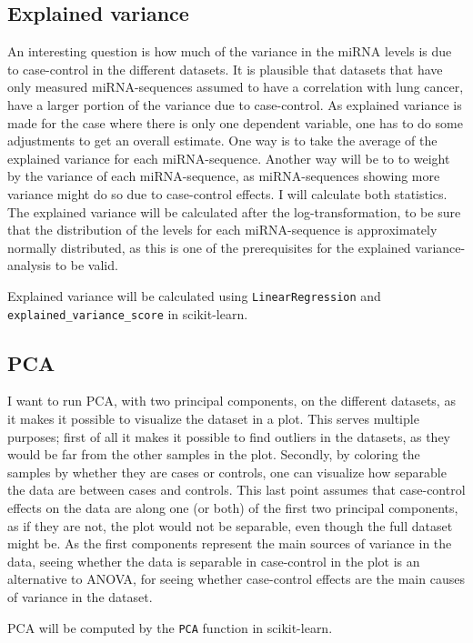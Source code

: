 \subsection{Explained variance}
An interesting question is how much of the variance in the miRNA levels is due to case-control in the different datasets. It is plausible that datasets that have only measured miRNA-sequences assumed to have a correlation with lung cancer, have a larger portion of the variance due to case-control. As explained variance is made for the case where there is only one dependent variable, one has to do some adjustments to get an overall estimate. One way is to take the average of the explained variance for each miRNA-sequence. Another way will be to to weight by the variance of each miRNA-sequence, as miRNA-sequences showing more variance might do so due to case-control effects. I will calculate both statistics. The explained variance will be calculated after the log-transformation, to be sure that the distribution of the levels for each miRNA-sequence is approximately normally distributed, as this is one of the prerequisites for the explained variance-analysis to be valid.

Explained variance will be calculated using \verb|LinearRegression| and \\ \verb|explained_variance_score| in scikit-learn.

\subsection{PCA}
I want to run PCA, with two principal components, on the different datasets, as it makes it possible to visualize the dataset in a plot. This serves multiple purposes; first of all it makes it possible to find outliers in the datasets, as they would be far from the other samples in the plot. Secondly, by coloring the samples by whether they are cases or controls, one can visualize how separable the data are between cases and controls. This last point assumes that case-control effects on the data are along one (or both) of the first two principal components, as if they are not, the plot would not be separable, even though the full dataset might be. As the first components represent the main sources of variance in the data, seeing whether the data is separable in case-control in the plot is an alternative to ANOVA, for seeing whether case-control effects are the main causes of variance in the dataset.

PCA will be computed by the \verb|PCA| function in scikit-learn.

